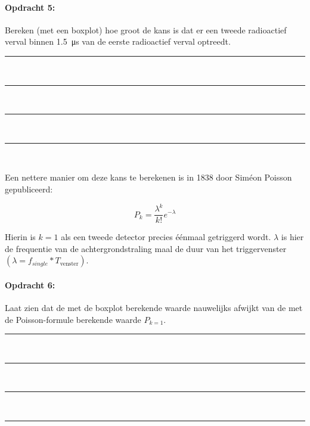 \begin{minipage}[t]{1\columnwidth}%

\paragraph{Opdracht 5:}

Bereken (met een boxplot) hoe groot de kans is dat er een
tweede radioactief verval binnen \SI{1.5}{\micro\second} van de eerste
radioactief verval optreedt.

\begin{center}
    \rule{\textwidth}{0.3mm}\\
    \rule{\textwidth}{0.3mm}\\
    \rule{\textwidth}{0.3mm}\\
    \rule{\textwidth}{0.3mm}\\
\end{center}
\end{minipage}

\bigskip{}

Een nettere manier om deze kans te berekenen is in 1838 door Siméon
Poisson \cite{wiki} gepubliceerd:

\begin{equation}
    P_{k}=\frac{\lambda^{k}}{k!}e^{-\lambda}
\end{equation}

Hierin is $k=1$ als een tweede detector precies éénmaal getriggerd
wordt. $\lambda$ is hier de frequentie van de achtergrondstraling
maal de duur van het triggervenster $\left(\lambda=f_{single}*T_\textrm{venster}\right)$.

\begin{minipage}[t]{1\columnwidth}%

\paragraph{Opdracht 6:}

Laat zien dat de met de boxplot berekende waarde nauwelijks
afwijkt van de met de Poisson-formule berekende waarde $P_{k=1}$.

\begin{center}
    \rule{\textwidth}{0.3mm}\\
    \rule{\textwidth}{0.3mm}\\
    \rule{\textwidth}{0.3mm}\\
    \rule{\textwidth}{0.3mm}\\
\end{center}
\end{minipage}

